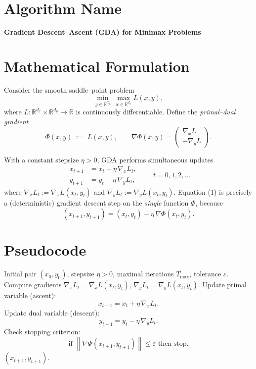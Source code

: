 \documentclass{article}
\newcommand{\norm}[1]{\left\lVert#1\right\rVert}
\newcommand{\gradx}{\nabla_{x} L}
\newcommand{\grady}{\nabla_{y} L}
\begin{document}
\section*{Algorithm Name}
\textbf{Gradient Descent–Ascent (GDA) for Minimax Problems}

\section*{Mathematical Formulation}
Consider the smooth saddle–point problem  
\[
\min_{y\in\mathbb{R}^{d_y}}\;\max_{x\in\mathbb{R}^{d_x}} L(x,y),
\]
where $L:\mathbb{R}^{d_x}\times\mathbb{R}^{d_y}\rightarrow\mathbb{R}$ is continuously differentiable.  
Define the \emph{primal–dual gradient}  
\[
\Phi(x,y)\;:=\;L(x,y),\qquad 
\nabla\Phi(x,y)=\begin{pmatrix}\gradx \\ -\grady\end{pmatrix}.
\]

With a constant stepsize $\eta>0$, GDA performs simultaneous updates
\[
\boxed{
\begin{aligned}
x_{t+1}&=x_t+\eta\,\gradx_t,\\[2mm]
y_{t+1}&=y_t-\eta\,\grady_t,
\end{aligned}}
\qquad t=0,1,2,\dots
\tag{1}
\]
where $\gradx_t:=\nabla_x L(x_t,y_t)$ and $\grady_t:=\nabla_y L(x_t,y_t)$.  
Equation (1) is precisely a (deterministic) gradient descent step on the \emph{single} function $\Phi$, because
\[
(x_{t+1},y_{t+1})=(x_t,y_t)-\eta\,\nabla\Phi(x_t,y_t).
\]

\section*{Pseudocode}
\begin{algorithm}[H]
\caption{Gradient Descent–Ascent (GDA)}
\begin{algorithmic}[1]
\REQUIRE Initial pair $(x_0,y_0)$, stepsize $\eta>0$, maximal iterations $T_{\max}$, tolerance $\varepsilon$.
    \STATE Compute gradients $\gradx_t=\nabla_x L(x_t,y_t)$, $\grady_t=\nabla_y L(x_t,y_t)$.
    \STATE Update primal variable (ascent):
    \[
    x_{t+1}=x_t+\eta\,\gradx_t.
    \]
    \STATE Update dual variable (descent):
    \[
    y_{t+1}=y_t-\eta\,\grady_t.
    \]
    \STATE Check stopping criterion:
    \[
    \text{if }\norm{\nabla\Phi(x_{t+1},y_{t+1})}\le \varepsilon\text{ then stop.}
    \]
\ENDFOR
\RETURN $(x_{t+1},y_{t+1})$.
\end{algorithmic}
\end{algorithm}
\end{document}
